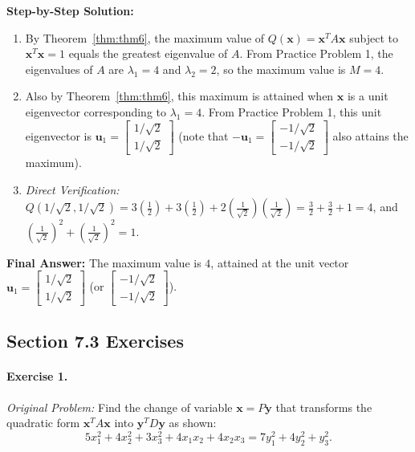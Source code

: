 \documentclass[11pt, letterpaper]{article}
\theoremstyle{definition}
\theoremstyle{remark}
\begin{document}
\textbf{Step-by-Step Solution:}
\begin{enumerate}[leftmargin=2em]
    \item By Theorem~\ref{thm:thm6}, the maximum value of $Q(\mathbf{x}) = \mathbf{x}^T A \mathbf{x}$ subject to $\mathbf{x}^T \mathbf{x} = 1$ equals the greatest eigenvalue of $A$. From Practice Problem 1, the eigenvalues of $A$ are $\lambda_1 = 4$ and $\lambda_2 = 2$, so the maximum value is $M = 4$.
    \item Also by Theorem~\ref{thm:thm6}, this maximum is attained when $\mathbf{x}$ is a unit eigenvector corresponding to $\lambda_1 = 4$. From Practice Problem 1, this unit eigenvector is $\mathbf{u}_1 = \begin{bmatrix} 1/\sqrt{2} \\ 1/\sqrt{2} \end{bmatrix}$ (note that $-\mathbf{u}_1 = \begin{bmatrix} -1/\sqrt{2} \\ -1/\sqrt{2} \end{bmatrix}$ also attains the maximum).
    \item \emph{Direct Verification:} $Q(1/\sqrt{2}, 1/\sqrt{2}) = 3\left(\frac{1}{2}\right) + 3\left(\frac{1}{2}\right) + 2\left(\frac{1}{\sqrt{2}}\right)\left(\frac{1}{\sqrt{2}}\right) = \frac{3}{2} + \frac{3}{2} + 1 = 4$, and $\left(\frac{1}{\sqrt{2}}\right)^2 + \left(\frac{1}{\sqrt{2}}\right)^2 = 1$.
\end{enumerate}
\textbf{Final Answer:} The maximum value is $4$, attained at the unit vector $\mathbf{u}_1 = \begin{bmatrix} 1/\sqrt{2} \\ 1/\sqrt{2} \end{bmatrix}$ (or $\begin{bmatrix} -1/\sqrt{2} \\ -1/\sqrt{2} \end{bmatrix}$).

\subsection{Section 7.3 Exercises}

\paragraph{Exercise 1.}
\emph{Original Problem:} Find the change of variable $\mathbf{x} = P\mathbf{y}$ that transforms the quadratic form $\mathbf{x}^T A \mathbf{x}$ into $\mathbf{y}^T D \mathbf{y}$ as shown:
\[
5x_1^2 + 4x_2^2 + 3x_3^2 + 4x_1 x_2 + 4x_2 x_3 = 7y_1^2 + 4y_2^2 + y_3^2.
\]
\end{document}
